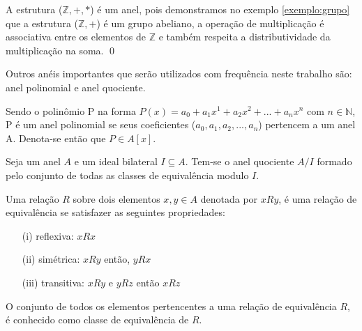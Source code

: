     \begin{exemplo}
        A estrutura ($\mathbb{Z},+,*$) é um anel, pois demonstramos no exemplo \ref{exemplo:grupo} que a estrutura ($\mathbb{Z},+$) é um grupo abeliano, a operação de multiplicação é associativa entre os elementos de $\mathbb{Z}$ e também respeita a distributividade da multiplicação na soma.
    \qed
    \end{exemplo}

    Outros anéis importantes que serão utilizados com frequência neste trabalho são: anel polinomial e anel quociente.
    
\begin{definition}
    Sendo o polinômio P na forma $P(x) = a_0 + a_1x^1 + a_2x^2 + ... + a_nx^n$ com $n \in \mathbb{N}$, P é um anel polinomial se seus coeficientes ($a_0, a_1, a_2,...,a_n$) pertencem a um anel A. Denota-se então que $P \in A[x]$.
\end{definition}

\begin{definition}
    Seja um anel $A$ e um ideal bilateral $I \subseteq A$. Tem-se o anel quociente $A/I$ formado pelo conjunto de todas as classes de equivalência modulo $I$.
\end{definition}

\begin{definition}
    Uma relação $R$ sobre dois elementos $x,y \in A$ denotada por $xRy$, é uma relação de equivalência se satisfazer as seguintes propriedades:

    \begin{itemize}
        \item[(i)] reflexiva: $xRx$
        \item[(ii)] simétrica: $xRy$ então, $yRx$
        \item[(iii)] transitiva: $xRy$ e $yRz$ então $xRz$
    \end{itemize}

    O conjunto de todos os elementos pertencentes a uma relação de equivalência $R$, é conhecido como classe de equivalência de $R$.
\end{definition}

